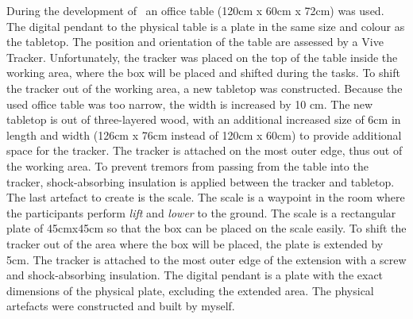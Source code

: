 During the development of \exgo\, an office table (120cm x 60cm x 72cm) was used. The digital pendant to the physical table is a plate in the same size and colour as the tabletop. The position and orientation of the table are assessed by a Vive Tracker. Unfortunately, the tracker was placed on the top of the table inside the working area, where the box will be placed and shifted during the tasks. To shift the tracker out of the working area, a new tabletop was constructed. Because the used office table was too narrow, the width is increased by 10 cm. The new tabletop is out of three-layered wood, with an additional increased size of 6cm in length and width (126cm x 76cm instead of 120cm x 60cm) to provide additional space for the tracker. The tracker is attached on the most outer edge, thus out of the working area. To prevent tremors from passing from the table into the tracker, shock-absorbing insulation is applied between the tracker and tabletop.\\
The last artefact to create is the scale. The scale is a waypoint in the room where the participants perform \textit{lift} and \textit{lower} to the ground. The scale is a rectangular plate of 45cmx45cm so that the box can be placed on the scale easily. To shift the tracker out of the area where the box will be placed, the plate is extended by 5cm. The tracker is attached to the most outer edge of the extension with a screw and shock-absorbing insulation. The digital pendant is a plate with the exact dimensions of the physical plate, excluding the extended area. The physical artefacts were constructed and built by myself.\\

